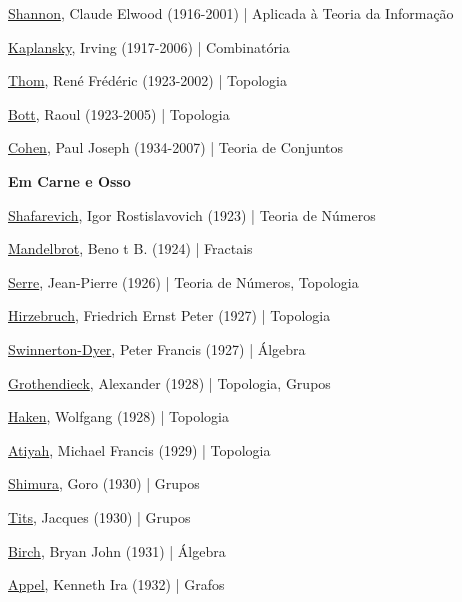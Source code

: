 \documentclass[12pt,a4paper]{article}
\begin{document}
			\href{http://en.wikipedia.org/wiki/Claude_Shannon}{Shannon}, Claude Elwood (1916-2001) | Aplicada \`a Teoria da Informa\c{c}\~ao

			\href{http://en.wikipedia.org/wiki/Irving_Kaplansky}{Kaplansky}, Irving (1917-2006) | Combinat\'oria

			\href{http://en.wikipedia.org/wiki/Ren\%C3\%A9_Thom}{Thom}, Ren\'e Fr\'ed\'eric (1923-2002) | Topologia

			\href{http://en.wikipedia.org/wiki/Raoul_Bott}{Bott}, Raoul (1923-2005) | Topologia

			\href{http://en.wikipedia.org/wiki/Paul_Cohen_(mathematician)}{Cohen}, Paul Joseph (1934-2007) | Teoria de Conjuntos

			\begin{flushright}
			\end{flushright}

			\textbf{Em Carne e Osso}

			\href{http://en.wikipedia.org/wiki/Shafarevich}{Shafarevich}, Igor Rostislavovich (1923) | Teoria de N\'umeros

			\href{http://en.wikipedia.org/wiki/Beno\%C3\%AEt_Mandelbrot}{Mandelbrot}, Beno t B. (1924) | Fractais

			\href{http://en.wikipedia.org/wiki/Jean-Pierre_Serre}{Serre}, Jean-Pierre (1926) | Teoria de N\'umeros, Topologia

			\href{http://en.wikipedia.org/wiki/Friedrich_Hirzebruch}{Hirzebruch}, Friedrich Ernst Peter (1927) | Topologia

			\href{http://en.wikipedia.org/wiki/Henry_Peter_Francis_Swinnerton-Dyer}{Swinnerton-Dyer}, Peter Francis (1927) | \'Algebra

			\href{http://en.wikipedia.org/wiki/Grothendieck}{Grothendieck}, Alexander (1928) | Topologia, Grupos

			\href{http://en.wikipedia.org/wiki/Wolfgang_Haken}{Haken}, Wolfgang (1928) | Topologia

			\href{http://en.wikipedia.org/wiki/Michael_Atiyah}{Atiyah}, Michael Francis (1929) | Topologia

			\href{http://en.wikipedia.org/wiki/Goro_Shimura}{Shimura}, Goro (1930) | Grupos

			\href{http://en.wikipedia.org/wiki/Jacques_Tits}{Tits}, Jacques (1930) | Grupos

			\href{http://en.wikipedia.org/wiki/Bryan_Birch}{Birch}, Bryan John (1931) | \'Algebra

			\href{http://en.wikipedia.org/wiki/Kenneth_Appel}{Appel}, Kenneth Ira (1932) | Grafos
\end{document}
